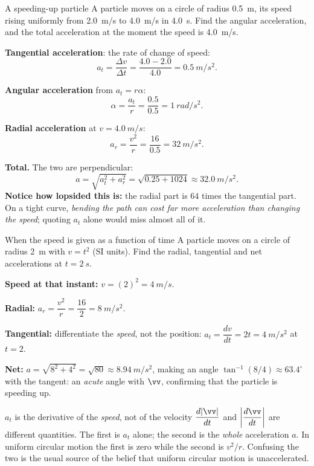 \begin{exbox}{A speeding-up particle}
A particle moves on a circle of radius \SI{0.5}{m}, its speed rising uniformly from \SI{2.0}{m/s} to
\SI{4.0}{m/s} in \SI{4.0}{s}. Find the angular acceleration, and the total acceleration at the moment the
speed is \SI{4.0}{m/s}.

 \textbf{Tangential acceleration}: the rate of change of speed:
\[
a_t=\frac{\Delta v}{\Delta t}=\frac{4.0-2.0}{4.0}=\SI{0.5}{m/s^2}.
\]

 \textbf{Angular acceleration} from $a_t=r\alpha$:
\[
\alpha=\frac{a_t}{r}=\frac{0.5}{0.5}=\SI{1}{rad/s^2}.
\]

 \textbf{Radial acceleration} at $v=\SI{4.0}{m/s}$:
\[
a_r=\frac{v^{2}}{r}=\frac{16}{0.5}=\SI{32}{m/s^2}.
\]

 \textbf{Total.} The two are perpendicular:
\[
a=\sqrt{a_t^{2}+a_r^{2}}=\sqrt{0.25+1024}\approx\SI{32.0}{m/s^2}.
\]
\textbf{Notice how lopsided this is:} the radial part is $64$ times the tangential part. On a tight
curve, \emph{bending the path can cost far more acceleration than changing the speed}; quoting $a_t$
alone would miss almost all of it.
\end{exbox}

\begin{exbox}{When the speed is given as a function of time}
A particle moves on a circle of radius \SI{2}{m} with $v=t^{2}$ (SI units). Find the radial, tangential
and net accelerations at $t=\SI{2}{s}$.

 \textbf{Speed at that instant:} $v=(2)^{2}=\SI{4}{m/s}$.

 \textbf{Radial:} $a_r=\dfrac{v^{2}}{r}=\dfrac{16}{2}=\SI{8}{m/s^2}$.

 \textbf{Tangential:} differentiate the \emph{speed}, not the position:
$a_t=\dfrac{dv}{dt}=2t=\SI{4}{m/s^2}$ at $t=2$.

 \textbf{Net:} $a=\sqrt{8^{2}+4^{2}}=\sqrt{80}\approx\SI{8.94}{m/s^2}$, making an angle
$\tan^{-1}(8/4)\approx63.4^\circ$ with the tangent: an \emph{acute} angle with $\vv$, confirming that
the particle is speeding up. 
\end{exbox}

\begin{trapbox}{$a_t$ is the derivative of the \emph{speed}, not of the velocity}
$\dfrac{d|\vv|}{dt}$ and $\left|\dfrac{d\vv}{dt}\right|$ are different quantities. The first is $a_t$
alone; the second is the \emph{whole} acceleration $a$. In uniform circular motion the first is zero
while the second is $v^{2}/r$. Confusing the two is the usual source of the belief that uniform
circular motion is unaccelerated.
\end{trapbox}


